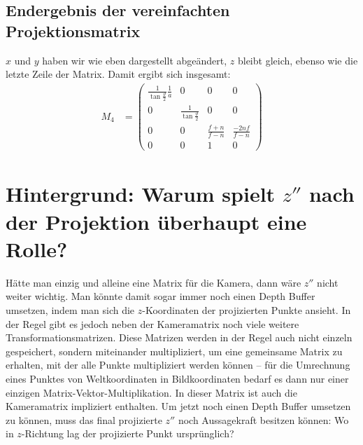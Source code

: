 \documentclass[a4paper,parskip=full*]{scrartcl}
\begin{document}
\subsection{Endergebnis der vereinfachten Projektionsmatrix}
$x$ und $y$ haben wir wie eben dargestellt abgeändert, $z$ bleibt
gleich, ebenso wie die letzte Zeile der Matrix. Damit ergibt sich
insgesamt:
\begin{align*}
	M_4 &=
	\begin{pmatrix}
		\frac{1}{\tan \frac{\vartheta}{2}} \frac{1}{a} & 0 & 0 & 0  \\
		0 & \frac{1}{\tan \frac{\vartheta}{2}} & 0 & 0  \\
		0 & 0 & \frac{f + n}{f - n} & \frac{-2nf}{f - n}  \\
		0 & 0 & 1 & 0
	\end{pmatrix}
\end{align*}

\section{Hintergrund: Warum spielt $z''$ nach der Projektion überhaupt
eine Rolle?}
Hätte man einzig und alleine eine Matrix für die Kamera, dann wäre $z''$
nicht weiter wichtig. Man könnte damit sogar immer noch einen Depth
Buffer umsetzen, indem man sich die $z$-Koordinaten der projizierten
Punkte ansieht. In der Regel gibt es jedoch neben der Kameramatrix noch
viele weitere Transformationsmatrizen. Diese Matrizen werden in der
Regel auch nicht einzeln gespeichert, sondern miteinander multipliziert,
um eine gemeinsame Matrix zu erhalten, mit der alle Punkte multipliziert
werden können -- für die Umrechnung eines Punktes von Weltkoordinaten in
Bildkoordinaten bedarf es dann nur einer einzigen
Matrix-Vektor-Multiplikation. In dieser Matrix ist auch die
Kameramatrix impliziert enthalten. Um jetzt noch einen Depth Buffer
umsetzen zu können, muss das final projizierte $z''$ noch Aussagekraft
besitzen können: Wo in $z$-Richtung lag der projizierte Punkt
ursprünglich?
\end{document}
